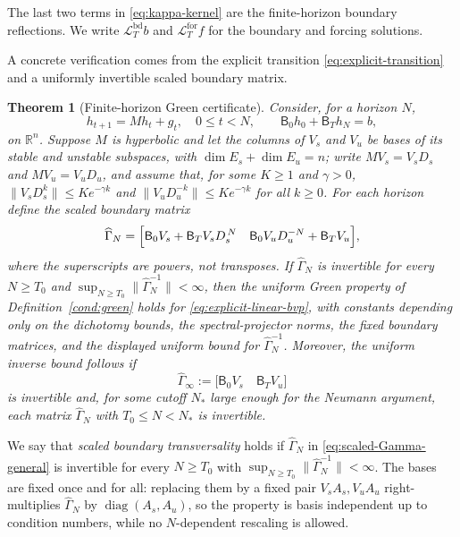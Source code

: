 \documentclass[twocolumn,nameyear,amsthm]{autart}
\newcommand{\R}{\mathbb R}
\newcommand{\Bzero}{\mathsf B_0}
\newcommand{\BT}{\mathsf B_T}
\newcommand{\norm}[1]{\lVert #1\rVert}
\numberwithin{equation}{section}
\newtheorem{theorem}{Theorem}[section]
\begin{document}
The last two terms in \eqref{eq:kappa-kernel} are the finite-horizon boundary
reflections.  We write $\mathcal L_T^{\mathrm{bd}}b$ and
$\mathcal L_T^{\mathrm{for}}f$ for the boundary and forcing solutions.


A concrete verification comes from the explicit transition
\eqref{eq:explicit-transition} and a uniformly invertible scaled boundary
matrix.

\begin{theorem}[Finite-horizon Green certificate]\label{prop:scaled-green}
Consider, for a horizon $N$,
\begin{equation}\label{eq:explicit-linear-bvp}
       h_{t+1}=Mh_t+g_t,\quad 0\le t<N,\qquad \Bzero h_0+\BT h_N=b,
\end{equation}
on $\R^n$.  Suppose $M$ is hyperbolic and let the columns of $V_s$ and $V_u$ be bases of its stable and unstable subspaces, with $\dim E_s+\dim E_u=n$; write $MV_s=V_sD_s$ and $MV_u=V_uD_u$, and assume that, for some $K\ge1$ and $\gamma>0$,
$\norm{V_sD_s^k}\le K e^{-\gamma k}$ and $\norm{V_uD_u^{-k}}\le K e^{-\gamma k}$ for all $k\ge0$.
For each horizon define the scaled boundary matrix
\begin{equation}\label{eq:scaled-Gamma-general}
       \widehat\Gamma_N=
       \Bigl[
       \Bzero V_s+\BT V_sD_s^{\,N}\quad
       \Bzero V_uD_u^{-N}+\BT V_u
       \Bigr],
\end{equation}
where the superscripts are powers, not transposes.  If $\widehat\Gamma_N$ is invertible for every $N\ge T_0$ and $\sup_{N\ge T_0}\norm{\widehat\Gamma_N^{-1}}<\infty$, then the uniform Green property of Definition~\ref{cond:green} holds for \eqref{eq:explicit-linear-bvp}, with constants depending only on the dichotomy bounds, the spectral-projector norms, the fixed boundary matrices, and the displayed uniform bound for $\widehat\Gamma_N^{-1}$.  Moreover, the uniform inverse bound follows if
\begin{equation}\label{eq:scaled-Gamma-limit}
       \widehat\Gamma_\infty:=\bigl[\Bzero V_s\quad \BT V_u\bigr]
\end{equation}
is invertible and, for some cutoff $N_*$ large enough for the Neumann argument, each matrix $\widehat\Gamma_N$ with $T_0\le N<N_*$ is invertible.
\end{theorem}

\noindent We say that \emph{scaled boundary transversality} holds if $\widehat\Gamma_N$ in \eqref{eq:scaled-Gamma-general} is invertible for every $N\ge T_0$ with $\sup_{N\ge T_0}\|\widehat\Gamma_N^{-1}\|<\infty$.  The bases are fixed once and for all: replacing them by a fixed pair $V_sA_s,V_uA_u$ right-multiplies $\widehat\Gamma_N$ by $\operatorname{diag}(A_s,A_u)$, so the property is basis independent up to condition numbers, while no $N$-dependent rescaling is allowed.
\end{document}

